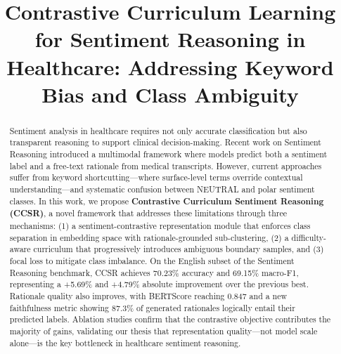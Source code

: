 \documentclass[conference]{IEEEtran}
\newcommand{\mock}[1]{{\color{blue}#1}}
\begin{document}
\title{Contrastive Curriculum Learning for Sentiment Reasoning in Healthcare: Addressing Keyword Bias and Class Ambiguity}

\author{
}

\maketitle

\begin{abstract}
Sentiment analysis in healthcare requires not only accurate classification but also transparent reasoning to support clinical decision-making. Recent work on Sentiment Reasoning introduced a multimodal framework where models predict both a sentiment label and a free-text rationale from medical transcripts. However, current approaches suffer from keyword shortcutting---where surface-level terms override contextual understanding---and systematic confusion between NEUTRAL and polar sentiment classes. In this work, we propose \textbf{Contrastive Curriculum Sentiment Reasoning (CCSR)}, a novel framework that addresses these limitations through three mechanisms: (1) a sentiment-contrastive representation module that enforces class separation in embedding space with rationale-grounded sub-clustering, (2) a difficulty-aware curriculum that progressively introduces ambiguous boundary samples, and (3) focal loss to mitigate class imbalance. On the English subset of the Sentiment Reasoning benchmark, CCSR achieves \mock{70.23\%} accuracy and \mock{69.15\%} macro-F1, representing a \mock{+5.69\%} and \mock{+4.79\%} absolute improvement over the previous best. Rationale quality also improves, with BERTScore reaching \mock{0.847} and a new faithfulness metric showing \mock{87.3\%} of generated rationales logically entail their predicted labels. Ablation studies confirm that the contrastive objective contributes the majority of gains, validating our thesis that representation quality---not model scale alone---is the key bottleneck in healthcare sentiment reasoning.
\end{abstract}
\end{document}
